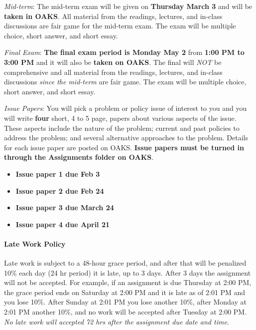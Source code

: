\vspace{0.1in}

\noindent \emph{Mid-term}: The mid-term exam will be given on
\textbf{Thursday March 3} and will be \textbf{taken in OAKS}. All
material from the readings, lectures, and in-class discussions are fair
game for the mid-term exam. The exam will be multiple choice, short
answer, and short essay.

\vspace{0.1in}

\noindent \emph{Final Exam}: \textbf{The final exam period is ‌Monday
May 2} from \textbf{1:00 PM to 3:00 PM} and it will also be
\textbf{taken on OAKS}. The final will \emph{NOT} be comprehensive and
all material from the readings, lectures, and in-class discussions
\emph{since the mid-term} are fair game. The exam will be multiple
choice, short answer, and short essay.

\vspace{0.1in}

\noindent \emph{Issue Papers}: You will pick a problem or policy issue
of interest to you and you will write \textbf{four} short, 4 to 5 page,
papers about various aspects of the issue. These aspects include the
nature of the problem; current and past policies to address the problem;
and several alternative approaches to the problem. Details for each
issue paper are posted on OAKS. \textbf{Issue papers must be turned in
through the Assignments folder on OAKS}.

\begin{itemize}

\item
  \textbf{Issue paper 1 due Feb 3}
\item
  \textbf{Issue paper 2 due Feb 24}
\item
  \textbf{Issue paper 3 due March 24}
\item
  \textbf{Issue paper 4 due April 21}
\end{itemize}

\hypertarget{late-work-policy}{%
\paragraph{Late Work Policy}\label{late-work-policy}}

Late work is subject to a 48-hour grace period, and after that will be
penalized 10\% each day (24 hr period) it is late, up to 3 days. After 3
days the assignment will not be accepted. For example, if an assignment
is due Thursday at 2:00 PM, the grace period ends on Saturday at 2:00 PM
and it is late as of 2:01 PM and you lose 10\%. After Sunday at 2:01 PM
you lose another 10\%, after Monday at 2:01 PM another 10\%, and no work
will be accepted after Tuesday at 2:00 PM. \emph{No late work will
accepted 72 hrs after the assignment due date and time}.

